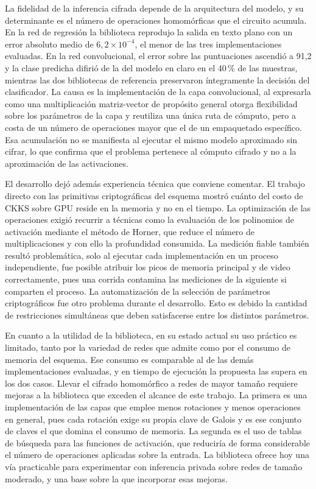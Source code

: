 La fidelidad de la inferencia cifrada depende de la arquitectura del modelo, y su determinante es el número de operaciones homomórficas que el circuito acumula. En la red de regresión la biblioteca reprodujo la salida en texto plano con un error absoluto medio de $6{,}2 \times 10^{-4}$, el menor de las tres implementaciones evaluadas. En la red convolucional, el error sobre las puntuaciones ascendió a 91,2 y la clase predicha difirió de la del modelo en claro en el 40\,\% de las muestras, mientras las dos bibliotecas de referencia preservaron íntegramente la decisión del clasificador. La causa es la implementación de la capa convolucional, al expresarla como una multiplicación matriz-vector de propósito general otorga flexibilidad sobre los parámetros de la capa y reutiliza una única ruta de cómputo, pero a costa de un número de operaciones mayor que el de un empaquetado específico. Esa acumulación no se manifiesta al ejecutar el mismo modelo aproximado sin cifrar, lo que confirma que el problema pertenece al cómputo cifrado y no a la aproximación de las activaciones.

El desarrollo dejó además experiencia técnica que conviene comentar. El trabajo directo con las primitivas criptográficas del esquema mostró cuánto del costo de CKKS sobre GPU reside en la memoria y no en el tiempo. La optimización de las operaciones exigió recurrir a técnicas como la evaluación de los polinomios de activación mediante el método de Horner, que reduce el número de multiplicaciones y con ello la profundidad consumida. La medición fiable también resultó problemática, solo al ejecutar cada implementación en un proceso independiente, fue posible atribuir los picos de memoria principal y de video correctamente, pues una corrida contamina las mediciones de la siguiente si comparten el proceso. La automatización de la selección de parámetros criptográficos fue otro problema durante el desarrollo. Esto es debido la cantidad de restricciones simultáneas que deben satisfacerse entre los distintos parámetros.

En cuanto a la utilidad de la biblioteca, en su estado actual su uso práctico es limitado, tanto por la variedad de redes que admite como por el consumo de memoria del esquema. Ese consumo es comparable al de las demás implementaciones evaluadas, y en tiempo de ejecución la propuesta las supera en los dos casos. Llevar el cifrado homomórfico a redes de mayor tamaño requiere mejoras a la biblioteca que exceden el alcance de este trabajo. La primera es una implementación de las capas que emplee menos rotaciones y menos operaciones en general, pues cada rotación exige su propia clave de Galois y es ese conjunto de claves el que domina el consumo de memoria. La segunda es el uso de tablas de búsqueda para las funciones de activación, que reduciría de forma considerable el número de operaciones aplicadas sobre la entrada. La biblioteca ofrece hoy una vía practicable para experimentar con inferencia privada sobre redes de tamaño moderado, y una base sobre la que incorporar esas mejoras.

